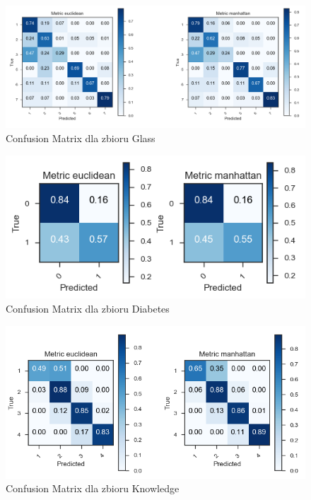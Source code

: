 \documentclass[12pt,a4paper]{article}
\begin{document}
\begin{figure}[H]
\centering
\includegraphics[width=1\textwidth]{MetricsGlass.PNG}
\caption{Confusion Matrix dla zbioru Glass}
\end{figure}

\begin{figure}[H]
\centering
\includegraphics[width=1\textwidth]{MetricsDiabetes.PNG}
\caption{Confusion Matrix dla zbioru Diabetes}
\end{figure}

\begin{figure}[H]
\centering
\includegraphics[width=1\textwidth]{MetricsKnowledge.PNG}
\caption{Confusion Matrix dla zbioru Knowledge}
\end{figure}
\end{document}
